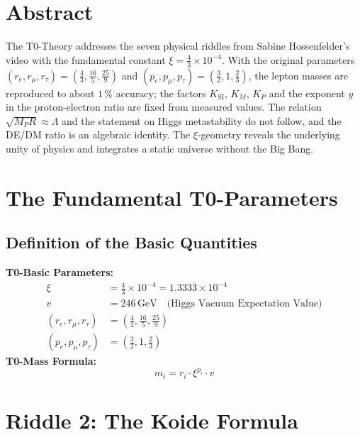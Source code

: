 \section*{Abstract}
		The T0-Theory addresses the seven physical riddles from Sabine Hossenfelder's video with the fundamental constant $\xi = \frac{4}{3} \times 10^{-4}$. With the original parameters $(r_e, r_\mu, r_\tau) = (\frac{4}{3}, \frac{16}{5}, \frac{25}{9})$ and $(p_e, p_\mu, p_\tau) = (\frac{3}{2}, 1, \frac{2}{3})$, the lepton masses are reproduced to about $1\,\%$ accuracy; the factors $K_{\text{SI}}$, $K_M$, $K_P$ and the exponent $y$ in the proton-electron ratio are fixed from measured values. The relation $\sqrt{M_P R} \approx \Lambda$ and the statement on Higgs metastability do not follow, and the DE/DM ratio is an algebraic identity. The $\xi$-geometry reveals the underlying unity of physics and integrates a static universe without the Big Bang.

	\section{The Fundamental T0-Parameters}
	\subsection{Definition of the Basic Quantities}
	\textbf{T0-Basic Parameters:}
	\begin{align}
		\xi &= \frac{4}{3} \times 10^{-4} = 1.333\overline{3} \times 10^{-4} \\
		v &= 246\,\si{\giga\electronvolt} \quad \text{(Higgs Vacuum Expectation Value)} \\
		(r_e, r_\mu, r_\tau) &= \left(\frac{4}{3}, \frac{16}{5}, \frac{25}{9}\right) \\
		(p_e, p_\mu, p_\tau) &= \left(\frac{3}{2}, 1, \frac{2}{3}\right)
	\end{align}
	\textbf{T0-Mass Formula:}
	\begin{equation}
		m_i = r_i \cdot \xi^{p_i} \cdot v
	\end{equation}
	\section{Riddle 2: The Koide Formula}

